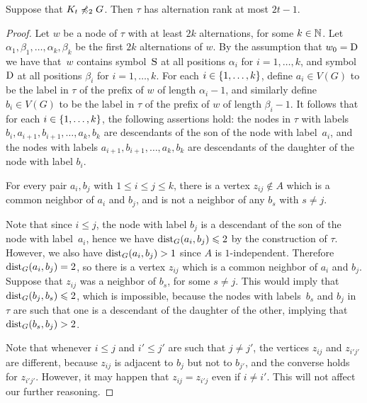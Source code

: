 \begin{lemma}\label{thm:alternation-rank-type-tree}
Suppose that  $K_t\not\preccurlyeq_{2} G$.
Then $\tau$ has alternation rank at most $2t-1$.
\end{lemma}
\begin{proof}
  Let $w$ be a node of $\tau$ with at least $2k$ alternations, for
  some $k\in \mathbb{N}$.  Let $\alpha_1,\beta_1,\ldots,\alpha_k,\beta_k$ be
  the first $2k$ alternations of $w$.  By the assumption that
  $w_0=\mathrm{D}$ we have that~$w$ contains symbol~$\mathrm{S}$ at all positions
  $\alpha_i$ for $i=1,\ldots,k$, and symbol~$\mathrm{D}$ at all positions
  $\beta_i$ for $i=1,\ldots,k$.  For each $i\in \{1,\ldots,k\}$,
  define $a_i\in V(G)$ to be the label in $\tau$ of the prefix of $w$
  of length $\alpha_i-1$, and similarly define $b_i\in V(G)$ to be the
  label in $\tau$ of the prefix of $w$ of length $\beta_i-1$.  It
  follows that for each $i\in \{1,\ldots,k\}$, the following
  assertions hold: the nodes in $\tau$ with labels
  $b_i,a_{i+1},b_{i+1},\ldots,a_k,b_k$ are descendants of the son of
  the node with label~$a_i$, and the nodes with labels
  $a_{i+1},b_{i+1},\ldots,a_k,b_k$ are descendants of the daughter of
  the node with label $b_i$.
	
  \begin{claim}\label{claim:minor}
    For every pair $a_i,b_j$ with $1\le i\le j\le k$, there is a
    vertex $z_{ij}\not\in A$ which is a common neighbor of $a_i$ and
    $b_j$, and is not a neighbor of any $b_s$ with $s\neq j$.
  \end{claim}
  \begin{clproof}
    Note that since $i\le j$, the node with label $b_j$ is a
    descendant of the son of the node with label~$a_i$, hence we have
    $\mathrm{dist}_G(a_i,b_j)\leqslant 2$ by the construction of $\tau$.  However,
    we also have $\mathrm{dist}_G(a_i,b_j)>1$ since $A$ is
    $1$-independent. Therefore $\mathrm{dist}_G(a_i,b_j)=2$, so there is a
    vertex $z_{ij}$ which is a common neighbor of $a_i$ and $b_j$.
    Suppose that $z_{ij}$ was a neighbor of $b_s$, for some $s\neq j$.
    This would imply that $\mathrm{dist}_G(b_j,b_s)\leqslant 2$, which is
    impossible, because the nodes with labels~$b_s$ and $b_j$ in
    $\tau$ are such that one is a descendant of the daughter of the
    other, implying that $\mathrm{dist}_G(b_s,b_j)>2$.
  \end{clproof}
  
  Note that whenever $i\leq j$ and $i'\leq j'$ are such that
  $j\neq j'$, the vertices $z_{ij}$ and $z_{i'j'}$ are different,
  because $z_{ij}$ is adjacent to $b_{j}$ but not to $b_{j'}$, and the
  converse holds for $z_{i'j'}$.  However, it may happen that
  $z_{ij}=z_{i'j}$ even if $i\neq i'$. This will not affect our
  further reasoning.


\end{proof}
